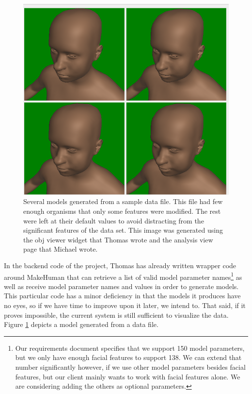 \documentclass[letterpaper,10pt, onecolumn, draftclsnofoot]{IEEEtran}
\begin{document}
\begin{figure}
	\includegraphics[width=\textwidth]{analysis.PNG}
	\caption{Several models generated from a sample data file. This file had few enough organisms that only some features were modified. The rest were left at their default values to avoid distracting from the significant features of the data set. This image was generated using the obj viewer widget that Thomas wrote and the analysis view page that Michael wrote.}
	\label{fig:generated}
\end{figure}

In the backend code of the project, Thomas has already written wrapper code around MakeHuman that can retrieve a list of valid model parameter names\footnote{Our requirements document specifies that we support 150 model parameters, but we only have enough facial features to support 138. We can extend that number significantly however, if we use other model parameters besides facial features, but our client mainly wants to work with facial features alone. We are considering adding the others as optional parameters.} as well as receive model parameter names and values in order to generate models. This particular code has a minor deficiency in that the models it produces have no eyes, so if we have time to improve upon it later, we intend to. That said, if it proves impossible, the current system is still sufficient to visualize the data. Figure \ref{fig:generated} depicts a model generated from a data file.
\end{document}
